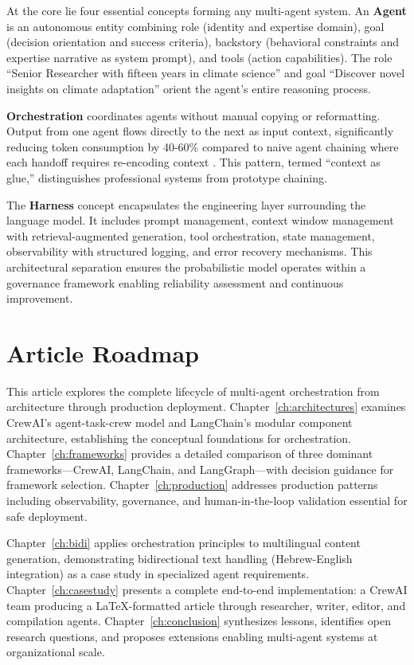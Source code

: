 At the core lie four essential concepts forming any multi-agent system. An \textbf{Agent} is an autonomous entity combining role (identity and expertise domain), goal (decision orientation and success criteria), backstory (behavioral constraints and expertise narrative as system prompt), and tools (action capabilities). The role ``Senior Researcher with fifteen years in climate science'' and goal ``Discover novel insights on climate adaptation'' orient the agent's entire reasoning process.

\textbf{Orchestration} coordinates agents without manual copying or reformatting. Output from one agent flows directly to the next as input context, significantly reducing token consumption by 40-60\% compared to naive agent chaining where each handoff requires re-encoding context \cite{Segal2026}. This pattern, termed ``context as glue,'' distinguishes professional systems from prototype chaining.

The \textbf{Harness} concept encapsulates the engineering layer surrounding the language model. It includes prompt management, context window management with retrieval-augmented generation, tool orchestration, state management, observability with structured logging, and error recovery mechanisms. This architectural separation ensures the probabilistic model operates within a governance framework enabling reliability assessment and continuous improvement.

\section{Article Roadmap}

This article explores the complete lifecycle of multi-agent orchestration from architecture through production deployment. Chapter~\ref{ch:architectures} examines CrewAI's agent-task-crew model and LangChain's modular component architecture, establishing the conceptual foundations for orchestration. Chapter~\ref{ch:frameworks} provides a detailed comparison of three dominant frameworks—CrewAI, LangChain, and LangGraph—with decision guidance for framework selection. Chapter~\ref{ch:production} addresses production patterns including observability, governance, and human-in-the-loop validation essential for safe deployment.

Chapter~\ref{ch:bidi} applies orchestration principles to multilingual content generation, demonstrating bidirectional text handling (Hebrew-English integration) as a case study in specialized agent requirements. Chapter~\ref{ch:casestudy} presents a complete end-to-end implementation: a CrewAI team producing a LaTeX-formatted article through researcher, writer, editor, and compilation agents. Chapter~\ref{ch:conclusion} synthesizes lessons, identifies open research questions, and proposes extensions enabling multi-agent systems at organizational scale.